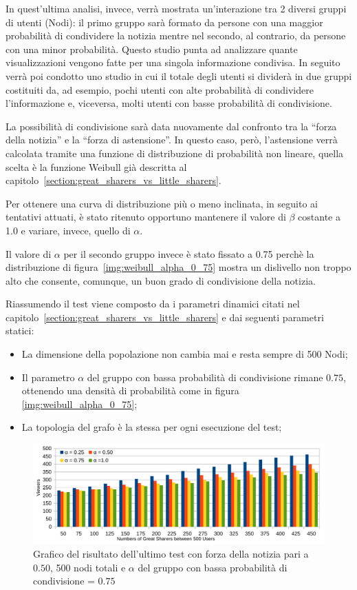 In quest'ultima analisi, invece, verrà mostrata un'interazione tra 2 diversi gruppi di utenti (Nodi):
il primo gruppo sarà formato da persone con una maggior probabilità di condividere la notizia 
mentre nel secondo, al contrario, da persone con una minor probabilità.
Questo studio punta ad analizzare quante visualizzazioni vengono fatte per una singola informazione condivisa.
In seguito verrà poi condotto uno studio in cui il totale degli utenti si dividerà in due gruppi costituiti da, ad esempio, 
pochi utenti con alte probabilità di condividere l'informazione e, viceversa, 
molti utenti con basse probabilità di condivisione.

La possibilità di condivisione sarà data nuovamente dal confronto tra la ``forza della notizia'' e la ``forza di astensione''. 
In questo caso, però, l'astensione verrà calcolata tramite una funzione di distribuzione di probabilità non lineare,
quella scelta è la funzione Weibull già descritta al capitolo~\ref{section:great_sharers_vs_little_sharers}.

Per ottenere una curva di distribuzione più o meno inclinata, in seguito ai tentativi attuati, 
è stato ritenuto opportuno mantenere il valore di $\beta$ costante a 1.0 e variare, invece, quello di $\alpha$.

Il valore di $\alpha$ per il secondo gruppo invece è stato fissato a 0.75 perchè 
la distribuzione di figura~\ref{img:weibull_alpha_0_75} mostra un dislivello non troppo 
alto che consente, comunque, un buon grado di condivisione della notizia.

Riassumendo il test viene composto da i parametri dinamici citati nel 
capitolo~\ref{section:great_sharers_vs_little_sharers} e dai seguenti parametri statici:
\begin{itemize}
\item La dimensione della popolazione non cambia mai e resta sempre di 500 Nodi;
\item Il parametro $\alpha$ del gruppo con bassa probabilità di condivisione rimane $0.75$, 
ottenendo una densità di probabilità come in figura \ref{img:weibull_alpha_0_75};
\item La topologia del grafo è la stessa per ogni esecuzione del test;
\end{itemize}


\begin{figure}[!ht]
\vspace*{-20pt}
\centerline {
  \includegraphics[width=1\textwidth]{charts/third-test-great-vs-little.pdf}
}
\caption{Grafico del risultato dell'ultimo test con forza della notizia pari a $0.50$, 
500 nodi totali e $\alpha$ del gruppo con bassa probabilità di condivisione = $0.75$}
\label{img:last_test_str_0_5}
\end{figure}

